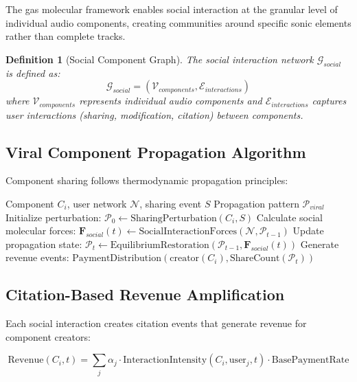 \documentclass[12pt,a4paper]{article}
\newtheorem{definition}[theorem]{Definition}
\begin{document}
The gas molecular framework enables social interaction at the granular level of individual audio components, creating communities around specific sonic elements rather than complete tracks.

\begin{definition}[Social Component Graph]
The social interaction network $\mathcal{G}_{social}$ is defined as:
\begin{equation}
\mathcal{G}_{social} = (\mathcal{V}_{components}, \mathcal{E}_{interactions})
\end{equation}
where $\mathcal{V}_{components}$ represents individual audio components and $\mathcal{E}_{interactions}$ captures user interactions (sharing, modification, citation) between components.
\end{definition}

\subsection{Viral Component Propagation Algorithm}

Component sharing follows thermodynamic propagation principles:

\begin{algorithm}
\caption{Viral Component Sharing Propagation}
\begin{algorithmic}[1]
\REQUIRE Component $C_i$, user network $\mathcal{N}$, sharing event $S$
\ENSURE Propagation pattern $\mathcal{P}_{viral}$
\STATE Initialize perturbation: $\mathcal{P}_0 \leftarrow \text{SharingPerturbation}(C_i, S)$
    \STATE Calculate social molecular forces: $\mathbf{F}_{social}(t) \leftarrow \text{SocialInteractionForces}(\mathcal{N}, \mathcal{P}_{t-1})$
    \STATE Update propagation state: $\mathcal{P}_t \leftarrow \text{EquilibriumRestoration}(\mathcal{P}_{t-1}, \mathbf{F}_{social}(t))$
    \STATE Generate revenue events: $\text{PaymentDistribution}(\text{creator}(C_i), \text{ShareCount}(\mathcal{P}_t))$
\ENDFOR
\end{algorithmic}
\end{algorithm}

\subsection{Citation-Based Revenue Amplification}

Each social interaction creates citation events that generate revenue for component creators:

\begin{equation}
\text{Revenue}(C_i, t) = \sum_{j} \alpha_j \cdot \text{InteractionIntensity}(C_i, \text{user}_j, t) \cdot \text{BasePaymentRate}
\end{equation}
\end{document}
